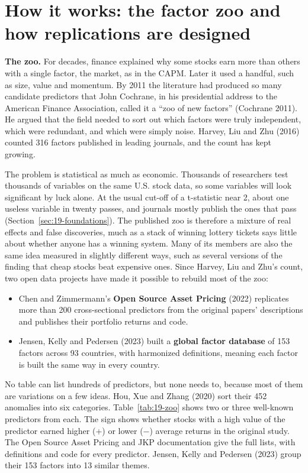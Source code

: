 \section{How it works: the factor zoo and how replications are designed}
\label{sec:19-how}

\textbf{The zoo.} For decades, finance explained why some stocks earn more than others with a single factor, the market, as in the CAPM. Later it used a handful, such as size, value and momentum. By 2011 the literature had produced so many candidate predictors that John Cochrane, in his presidential address to the American Finance Association, called it a ``zoo of new factors'' (Cochrane 2011). He argued that the field needed to sort out which factors were truly independent, which were redundant, and which were simply noise. Harvey, Liu and Zhu (2016) counted 316 factors published in leading journals, and the count has kept growing.

The problem is statistical as much as economic. Thousands of researchers test thousands of variables on the same U.S. stock data, so some variables will look significant by luck alone. At the usual cut-off of a t-statistic near 2, about one useless variable in twenty passes, and journals mostly publish the ones that pass (Section~\ref{sec:19-foundations}). The published zoo is therefore a mixture of real effects and false discoveries, much as a stack of winning lottery tickets says little about whether anyone has a winning system. Many of its members are also the same idea measured in slightly different ways, such as several versions of the finding that cheap stocks beat expensive ones. Since Harvey, Liu and Zhu's count, two open data projects have made it possible to rebuild most of the zoo:

\begin{itemize}
  \item Chen and Zimmermann's \textbf{Open Source Asset Pricing} (2022) replicates more than 200 cross-sectional predictors from the original papers' descriptions and publishes their portfolio returns and code.
  \item Jensen, Kelly and Pedersen (2023) built a \textbf{global factor database} of 153 factors across 93 countries, with harmonized definitions, meaning each factor is built the same way in every country.
\end{itemize}

No table can list hundreds of predictors, but none needs to, because most of them are variations on a few ideas. Hou, Xue and Zhang (2020) sort their 452 anomalies into six categories. Table~\ref{tab:19-zoo} shows two or three well-known predictors from each. The sign shows whether stocks with a high value of the predictor earned higher (+) or lower ($-$) average returns in the original study. The Open Source Asset Pricing and JKP documentation give the full lists, with definitions and code for every predictor. Jensen, Kelly and Pedersen (2023) group their 153 factors into 13 similar themes.

